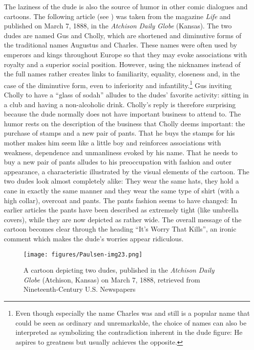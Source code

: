 The laziness of the dude is also the source of humor in other comic dialogues and cartoons. The following article (see ) was taken from the magazine \emph{Life} and published on March 7, 1888, in the \emph{Atchison Daily Globe} (Kansas). The two dudes are named Gus and Cholly, which are shortened and diminutive forms of the traditional names Augustus and Charles. These names were often used by emperors and kings throughout Europe so that they may evoke associations with royalty and a superior social position. However, using the nicknames instead of the full names rather creates links to familiarity, equality, closeness and, in the case of the diminutive form, even to inferiority and infantility.\footnote{Even though especially the name Charles was and still is a popular name that could be seen as ordinary and unremarkable, the choice of names can also be interpreted as symbolizing the contradiction inherent in the dude figure: He aspires to greatness but usually achieves the opposite.} Gus inviting Cholly to have a “glass of sodah” alludes to the dudes’ favorite activity: sitting in a club and having a non-alcoholic drink. Cholly’s reply is therefore surprising because the dude normally does not have important business to attend to. The humor rests on the description of the business that Cholly deems important: the purchase of stamps and a new pair of pants. That he buys the stamps for his mother makes him seem like a little boy and reinforces associations with weakness, dependence and unmanliness evoked by his name. That he needs to buy a new pair of pants alludes to his preoccupation with fashion and outer appearance, a characteristic illustrated by the visual elements of the cartoon. The two dudes look almost completely alike: They wear the same hats, they hold a cane in exactly the same manner and they wear the same type of shirt (with a high collar), overcoat and pants. The pants fashion seems to have changed: In earlier articles the pants have been described as extremely tight (like umbrella covers), while they are now depicted as rather wide. The overall message of the cartoon becomes clear through the heading “It’s Worry That Kills”, an ironic comment which makes the dude’s worries appear ridiculous.


\begin{figure}[t]
\texttt{[image: figures/Paulsen-img23.png]}
\caption{
A cartoon depicting two dudes, published in the \emph{Atchison Daily Globe} (Atchison, Kansas) on March 7, 1888, retrieved from Nineteenth-Century U.S. Newspapers
}
\label{fig:key:23}
\end{figure}

